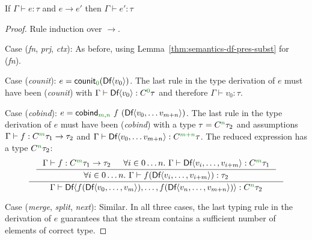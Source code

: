 \begin{theorem}
\label{thm:semantics-df-pres}
  If $\Gamma \vdash e : \tau$ and $e \rightarrow e'$ then $\Gamma \vdash e' : \tau$
\end{theorem}
\begin{proof}
  Rule induction over $\rightarrow$.
  
\vspace{0.25em}\noindent\hangindent=0.6cm 
Case (\emph{fn}, \emph{prj}, \emph{ctx}): As before, using Lemma~\ref{thm:semantics-df-pres-subst} for (\emph{fn}).

\vspace{0.25em}\noindent\hangindent=0.6cm 
Case (\emph{counit}): $e = \ident{counit}_{\cclrd{0}}(\ident{Df} \langle v_0 \rangle)$. The last rule in the type
  derivation of $e$ must have been (\emph{counit}) with $\Gamma \vdash \ident{Df} \langle v_0 \rangle : \ctyp{\cclrd{0}}\tau$
  and therefore $\Gamma \vdash v_0 : \tau$.

\vspace{0.25em}\noindent\hangindent=0.6cm 
Case (\emph{cobind}): $e = \ident{cobind}_{\cclrd{m}, \cclrd{n}}~f~(\ident{Df}\langle v_0, \ldots v_{m+n} \rangle)$. The
  last rule in the type derivation of $e$ must have been (\emph{cobind}) with a type $\tau = \ctyp{\cclrd{n}}\tau_2$ and assumptions
  $\Gamma \vdash f : \ctyp{\cclrd{m}}{\tau_1} \rightarrow \tau_2$ and $\Gamma \vdash \ident{Df}\langle v_0, \ldots v_{m+n} \rangle : \ctyp{\cclrd{m+n}}{\tau}$.
  The reduced expression has a type $\ctyp{\cclrd{n}}\tau_2$:
\begin{equation*}
\inference
  { \inference 
      { \Gamma \vdash f : \ctyp{\cclrd{m}}{\tau_1} \rightarrow \tau_2 & \forall i\in 0 \ldots n.~\Gamma\vdash \ident{Df}\langle v_i, \ldots, v_{i+m} \rangle :  \ctyp{\cclrd{m}}{\tau_1}}  
      { \forall i\in 0 \ldots n.~\Gamma\vdash f (\ident{Df}\langle v_i, \ldots, v_{i+m} \rangle) : \tau_2} }
  { \Gamma \vdash \ident{Df}\langle f (\ident{Df}\langle v_0, \ldots, v_m \rangle), \ldots, f (\ident{Df}\langle v_{n}, \ldots, v_{m+n} \rangle) \rangle : \ctyp{\cclrd{n}}\tau_2 }
\end{equation*}

\vspace{0.25em}\noindent\hangindent=0.6cm 
Case (\emph{merge}, \emph{split}, \emph{next}): Similar. In all three cases, the last typing rule in the derivation of $e$
  guarantees that the stream contains a sufficient number of elements of correct type.
\end{proof}

